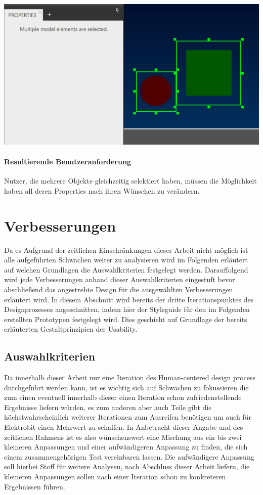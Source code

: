 \begin{center}
  \includegraphics[scale=0.8]{figures/Mehrfachselektion.png}
  \label{fig:Mehrfachselektion}
\end{center}

\paragraph{Resultierende Benutzeranforderung}
Nutzer, die mehrere Objekte gleichzeitig selektiert haben, müssen die Möglichkeit haben all deren Properties nach ihren Wünschen zu verändern.

\section{Verbesserungen}
Da es Aufgrund der zeitlichen Einschränkungen dieser Arbeit nicht möglich ist alle aufgeführten Schwächen weiter zu analysieren wird im Folgenden erläutert auf welchen Grundlagen die Auswahlkriterien festgelegt werden.
Darauffolgend wird jede Verbesserungen anhand dieser Auswahlkriterien eingestuft bevor abschließend das angestrebte Design für die ausgewählten Verbesserungen erläutert wird.
In diesem Abschnitt wird bereits der dritte Iterationspunktes des Designprozesses angeschnitten, indem hier der Styleguide für den im Folgenden erstellten Prototypen festgelegt wird. Dies geschieht auf Grundlage der bereits erläuterten Gestaltprinzipien der Usability.

\subsection{Auswahlkriterien}
Da innerhalb dieser Arbeit nur eine Iteration des Human-centered design process durchgeführt werden kann, ist es wichtig sich auf Schwächen zu fokussieren die zum einen eventuell innerhalb dieser einen Iteration schon zufriedenstellende Ergebnisse liefern würden, es zum anderen aber auch Teile gibt die höchstwahrscheinlich weiterer Iterationen zum Ausreifen benötigen um auch für Elektrobit einen Mehrwert zu schaffen.
In Anbetracht dieser Angabe und des zeitlichen Rahmens ist es also wünschenswert eine Mischung aus ein bis zwei kleineren Anpassungen und einer aufwändigeren Anpassung zu finden, die sich einem zusammengehörigen Test vereinbaren lassen.
Die aufwändigere Anpassung soll hierbei Stoff für weitere Analysen, nach Abschluss dieser Arbeit liefern, die kleineren Anpassungen sollen nach einer Iteration schon zu konkreteren Ergebnissen führen.

